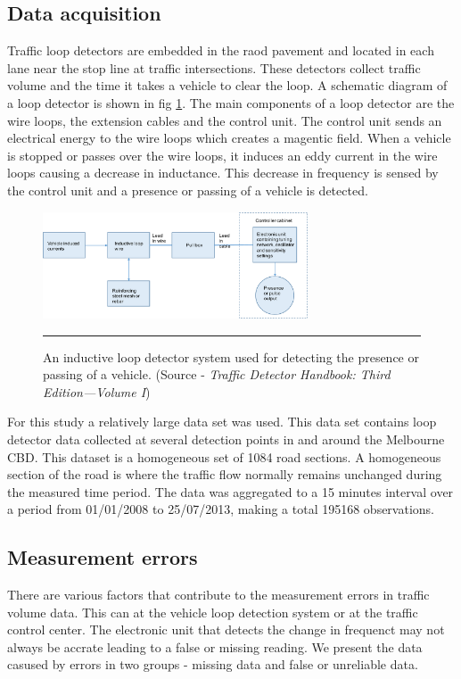 \subsection{Data acquisition}
Traffic loop detectors are embedded in the raod pavement and located in each lane near the stop
line at traffic intersections. These detectors collect traffic volume and the time it takes a
vehicle to clear the loop. A schematic diagram of a loop detector is shown in fig \ref{fig:loopDetector}.
The main components of a loop detector are the wire loops, the extension cables and the control unit.
The control unit sends an electrical energy to the wire loops which creates a magentic field. When a
vehicle is stopped or passes over the wire loops, it induces an eddy current in the wire loops causing
a decrease in inductance. This decrease in frequency is sensed by the control unit and a presence or
passing of a vehicle is detected.

\begin{figure}[htbp]
  \centering
    \includegraphics[width=0.7\textwidth,height=0.7\textheight,keepaspectratio]{Figures/loop-detector.pdf}
    \rule{35em}{0.5pt}
  \caption[A vehicle loop detector system]{An inductive loop detector system used for detecting the
  presence or passing of a vehicle. (Source - \textit{Traffic Detector Handbook: Third Edition—Volume I})}
  \label{fig:loopDetector}
\end{figure}

For this study a relatively large data set was used. This data set contains loop detector data collected
at several detection points in and around the Melbourne CBD. This dataset is a homogeneous set of
1084 road sections. A homogeneous section of the road is where the traffic flow normally remains unchanged
during the measured time period. The data was aggregated to a 15 minutes interval over a period
from 01/01/2008 to 25/07/2013, making a total 195168 observations.

\subsection{Measurement errors}
There are various factors that contribute to the measurement errors in traffic volume data. This can
at the vehicle loop detection system or at the traffic control center. The electronic unit that
detects the change in frequenct may not always be accrate leading to a false or missing reading.
We present the data casused by errors in two groups - missing data and false or unreliable data.

